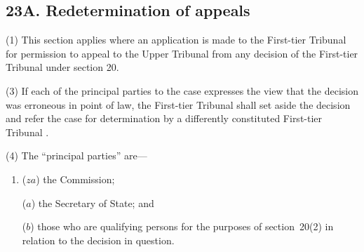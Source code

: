 \documentclass[12pt,a4paper]{article}
\begin{document}
\subsection{23A. Redetermination of appeals}

(1) This section applies where an application is made 
to the First-tier Tribunal for permission to appeal to the Upper Tribunal from any decision of the First-tier Tribunal under section 20.  %


(3) If each of the principal parties to the case expresses the view that the decision was erroneous in point of law, 
the First-tier Tribunal  %
shall set aside the decision and refer the case for determination by a differently constituted 
First-tier Tribunal%
.

(4) The “principal parties” are—
\begin{enumerate}\item[]
($za$) the Commission;

($a$) the Secretary of State; and

($b$) those who are qualifying persons for the purposes of section~20(2)  in relation to the decision in question.
\end{enumerate}


\end{document}
